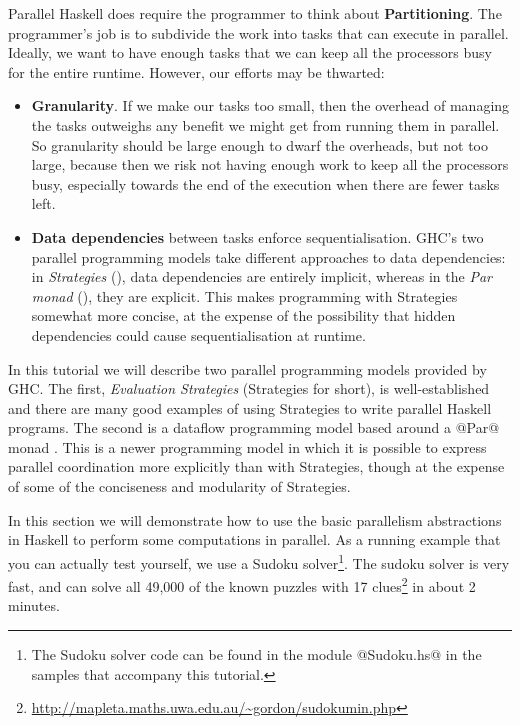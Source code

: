 Parallel Haskell does require the programmer to think about
\textbf{Partitioning}.  The programmer's job is to subdivide the work
into tasks that can execute in parallel.  Ideally, we want to have
enough tasks that we can keep all the processors busy for the entire
runtime.  However, our efforts may be thwarted:
  \begin{itemize}
    \item \textbf{Granularity}.  If we make our tasks too small, then
      the overhead of managing the tasks outweighs any benefit we
      might get from running them in parallel.  So granularity should
      be large enough to dwarf the overheads, but not too large,
      because then we risk not having enough work to keep all the
      processors busy, especially towards the end of the execution
      when there are fewer tasks left.
    \item \textbf{Data dependencies} between tasks enforce
      sequentialisation.  GHC's two parallel programming models take
      different approaches to data dependencies: in \emph{Strategies}
      (), data dependencies are entirely implicit,
      whereas in the \emph{Par monad} (), they are
      explicit.  This makes programming with Strategies somewhat more
      concise, at the expense of the possibility that hidden
      dependencies could cause sequentialisation at runtime.
  \end{itemize}


In this tutorial we will describe two parallel programming models
provided by GHC.  The first, \emph{Evaluation Strategies}
\cite{seq-no-more} (Strategies for short), is well-established and
there are many good examples of using Strategies to write parallel
Haskell programs.  The second is a dataflow programming model based
around a @Par@ monad \cite{monad-par}.  This is a newer programming
model in which it is possible to express parallel coordination more
explicitly than with Strategies, though at the expense of some of the
conciseness and modularity of Strategies.


In this section we will demonstrate how to use the basic parallelism
abstractions in Haskell to perform some computations in parallel.  As
a running example that you can actually test yourself, we use a Sudoku
solver\footnote{The Sudoku solver code can be found in the module
  @Sudoku.hs@ in the samples that accompany this tutorial.}.  The
sudoku solver is very fast, and can solve all 49,000 of the known
puzzles with 17
clues\footnote{\url{http://mapleta.maths.uwa.edu.au/~gordon/sudokumin.php}}
in about 2 minutes.

